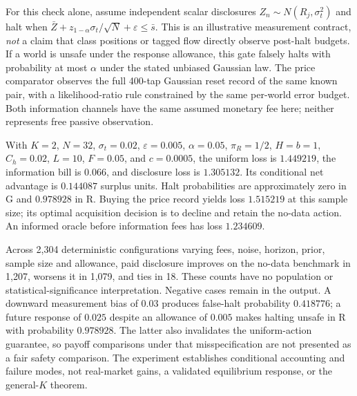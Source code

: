 \documentclass[12pt]{article}
\theoremstyle{definition}
\theoremstyle{remark}
\begin{document}
For this check alone, assume independent scalar disclosures $Z_n\sim N(R_j,\sigma_t^2)$ and halt when $\bar Z+z_{1-\alpha}\sigma_t/\sqrt N+\varepsilon\le\bar s$. This is an illustrative measurement contract, \emph{not} a claim that class positions or tagged flow directly observe post-halt budgets. If a world is unsafe under the response allowance, this gate falsely halts with probability at most $\alpha$ under the stated unbiased Gaussian law. The price comparator observes the full 400-tap Gaussian reset record of the same known pair, with a likelihood-ratio rule constrained by the same per-world error budget. Both information channels have the same assumed monetary fee here; neither represents free passive observation.

With $K=2$, $N=32$, $\sigma_t=0.02$, $\varepsilon=0.005$, $\alpha=0.05$, $\pi_R=1/2$, $H=b=1$, $C_h=0.02$, $L=10$, $F=0.05$, and $c=0.0005$, the uniform loss is $1.449219$, the information bill is $0.066$, and disclosure loss is $1.305132$. Its conditional net advantage is $0.144087$ surplus units. Halt probabilities are approximately zero in G and $0.978928$ in R. Buying the price record yields loss $1.515219$ at this sample size; its optimal acquisition decision is to decline and retain the no-data action. An informed oracle before information fees has loss $1.234609$.

Across 2,304 deterministic configurations varying fees, noise, horizon, prior, sample size and allowance, paid disclosure improves on the no-data benchmark in 1,207, worsens it in 1,079, and ties in 18. These counts have no population or statistical-significance interpretation. Negative cases remain in the output. A downward measurement bias of $0.03$ produces false-halt probability $0.418776$; a future response of $0.025$ despite an allowance of $0.005$ makes halting unsafe in R with probability $0.978928$. The latter also invalidates the uniform-action guarantee, so payoff comparisons under that misspecification are not presented as a fair safety comparison. The experiment establishes conditional accounting and failure modes, not real-market gains, a validated equilibrium response, or the general-$K$ theorem.
\end{document}
